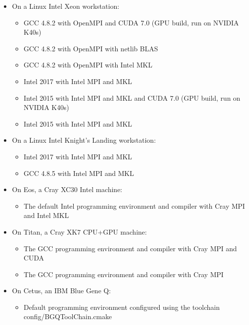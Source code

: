 \begin{itemize}
\item On a Linux Intel Xeon workstation:
  \begin{itemize}
  \item GCC 4.8.2 with OpenMPI and CUDA 7.0 (GPU build, run on NVIDIA K40s)
  \item GCC 4.8.2 with OpenMPI with netlib BLAS
  \item GCC 4.8.2 with OpenMPI with Intel MKL
  \item Intel 2017 with Intel MPI and MKL
  \item Intel 2015 with Intel MPI and MKL and CUDA 7.0 (GPU build, run on NVIDIA K40s)
  \item Intel 2015 with Intel MPI  and MKL
  \end{itemize}
\item On a Linux Intel Knight's Landing workstation:
  \begin{itemize}
  \item Intel 2017 with Intel MPI and MKL
 \item GCC 4.8.5 with Intel MPI and MKL
  \end{itemize}
\item On Eos, a Cray XC30 Intel machine:
  \begin{itemize}
\item The default Intel programming environment and compiler with Cray MPI and Intel MKL
  \end{itemize}

\item On Titan, a Cray XK7 CPU+GPU machine:
  \begin{itemize}
  \item The GCC programming environment and compiler with Cray MPI and CUDA
  \item The GCC programming environment and compiler with Cray MPI
  \end{itemize}
\item On Cetus, an IBM Blue Gene Q:
\begin{itemize}
\item Default programming environment configured using the  toolchain config/BGQToolChain.cmake
\end{itemize}
\end{itemize}

